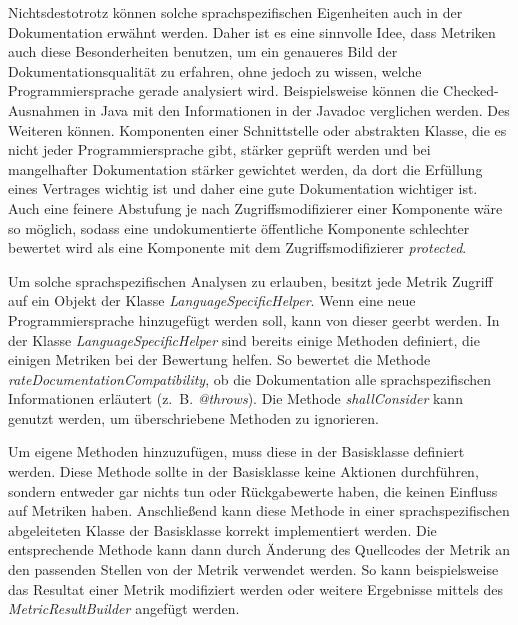 Nichtsdestotrotz können solche sprachspezifischen Eigenheiten auch in der Dokumentation erwähnt werden. Daher ist es eine sinnvolle Idee, dass Metriken auch diese Besonderheiten benutzen, um ein genaueres Bild der Dokumentationsqualität zu erfahren, ohne jedoch zu wissen, welche Programmiersprache gerade analysiert wird. Beispielsweise können die Checked-Ausnahmen in Java mit den Informationen in der Javadoc verglichen werden. Des Weiteren können. Komponenten einer Schnittstelle oder abstrakten Klasse, die es nicht jeder Programmiersprache gibt, stärker geprüft werden und bei mangelhafter Dokumentation stärker gewichtet werden, da dort die Erfüllung eines Vertrages wichtig ist und daher eine gute Dokumentation wichtiger ist. Auch eine feinere Abstufung je nach Zugriffsmodifizierer einer Komponente wäre so möglich, sodass eine undokumentierte öffentliche Komponente schlechter bewertet wird als eine Komponente mit dem Zugriffsmodifizierer  \textit{protected}. 

Um solche sprachspezifischen Analysen zu erlauben, besitzt jede Metrik Zugriff auf ein Objekt der Klasse \textit{LanguageSpecificHelper}. Wenn eine neue Programmiersprache hinzugefügt werden soll, kann von dieser geerbt werden. In der Klasse \textit{LanguageSpecificHelper} sind bereits einige Methoden definiert, die einigen Metriken bei der Bewertung helfen. So bewertet die Methode \textit{rateDocumentationCompatibility}, ob die Dokumentation alle sprachspezifischen Informationen erläutert (z.~B. \textit{@throws}). Die Methode \textit{shallConsider} kann genutzt werden, um überschriebene Methoden zu ignorieren. 

Um eigene Methoden hinzuzufügen, muss diese in der Basisklasse definiert werden. Diese Methode sollte in der Basisklasse keine Aktionen durchführen, sondern entweder gar nichts tun oder Rückgabewerte haben, die keinen Einfluss auf Metriken haben. Anschließend kann diese Methode in einer sprachspezifischen abgeleiteten Klasse der Basisklasse korrekt implementiert werden. Die entsprechende Methode kann dann durch Änderung des Quellcodes der Metrik an den passenden Stellen von der Metrik verwendet werden. So kann beispielsweise das Resultat einer Metrik modifiziert werden oder weitere Ergebnisse mittels des \textit{MetricResultBuilder} angefügt werden.





